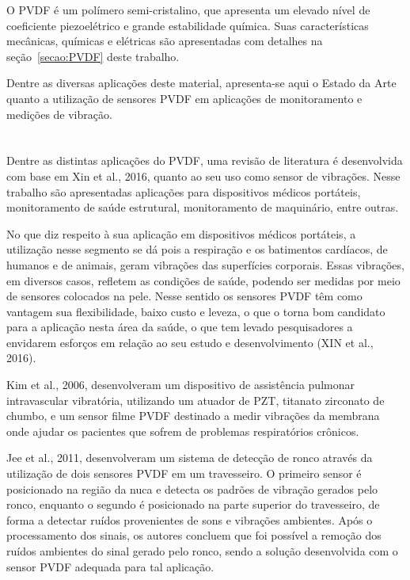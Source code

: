 \documentclass[
	12pt,				
	oneside,			
	a4paper,			
	english,			
	brazil,	
	sumario=abnt-6027-2012		
	]{abntex2ppgsi}
\begin{document}
O PVDF é um polímero semi-cristalino, que apresenta um elevado nível de coeficiente piezoelétrico e grande estabilidade química. Suas características mecânicas, químicas e elétricas são apresentadas com detalhes na seção~\ref{secao:PVDF} deste trabalho. 

Dentre as diversas aplicações deste material, apresenta-se aqui o Estado da Arte quanto a utilização de sensores PVDF em aplicações de monitoramento e medições de vibração.

\section{}

Dentre as distintas aplicações do PVDF, uma revisão de literatura é desenvolvida com base em Xin et al., 2016, quanto ao seu uso como sensor de vibrações. Nesse trabalho são apresentadas aplicações para dispositivos médicos portáteis, monitoramento de saúde estrutural, monitoramento de maquinário, entre outras.

No que diz respeito à sua aplicação em dispositivos médicos portáteis, a utilização nesse segmento se dá pois a respiração e os batimentos cardíacos, de humanos e de animais, geram vibrações das superfícies corporais. Essas vibrações, em diversos casos, refletem as condições de saúde, podendo ser medidas por meio de sensores colocados na pele. Nesse sentido os sensores PVDF têm como vantagem sua flexibilidade, baixo custo e leveza, o que o torna bom candidato para a aplicação nesta área da saúde, o que tem levado pesquisadores a envidarem esforços em relação ao seu estudo e desenvolvimento (XIN et al., 2016).

Kim et al., 2006, desenvolveram um dispositivo de assistência pulmonar intravascular vibratória, utilizando um atuador de PZT, titanato zirconato de chumbo, e um sensor filme PVDF destinado a medir vibrações da membrana onde ajudar os pacientes que sofrem de problemas respiratórios crônicos.

Jee et al., 2011, desenvolveram um sistema de detecção de ronco através da utilização de dois sensores PVDF em um travesseiro. O primeiro sensor é posicionado na região da nuca e detecta os padrões de vibração gerados pelo ronco, enquanto o segundo é posicionado na parte superior do travesseiro, de forma a detectar ruídos provenientes de sons e vibrações ambientes. Após o processamento dos sinais, os autores concluem que foi possível a remoção dos ruídos ambientes do sinal gerado pelo ronco, sendo a solução desenvolvida com o sensor PVDF adequada para tal aplicação.
\end{document}
